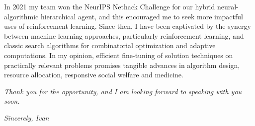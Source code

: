 \documentclass[12pt]{letter}
\begin{document}
In 2021 my team won the NeurIPS Nethack Challenge for our hybrid neural-algorithmic hierarchical agent, and this encouraged me to seek more impactful uses of reinforcement learning. Since then, I have been captivated by the synergy between machine learning approaches, particularly reinforcement learning, and classic search algorithms for combinatorial optimization and adaptive computations. In my opinion, efficient fine-tuning of solution techniques on practically relevant problems promises tangible advances in algorithm design, resource allocation, responsive social welfare and medicine.




\emph{Thank you for the opportunity, and I am looking forward to speaking with you soon.}
\par
\hfill \emph{Sincerely, Ivan}
\end{document}
